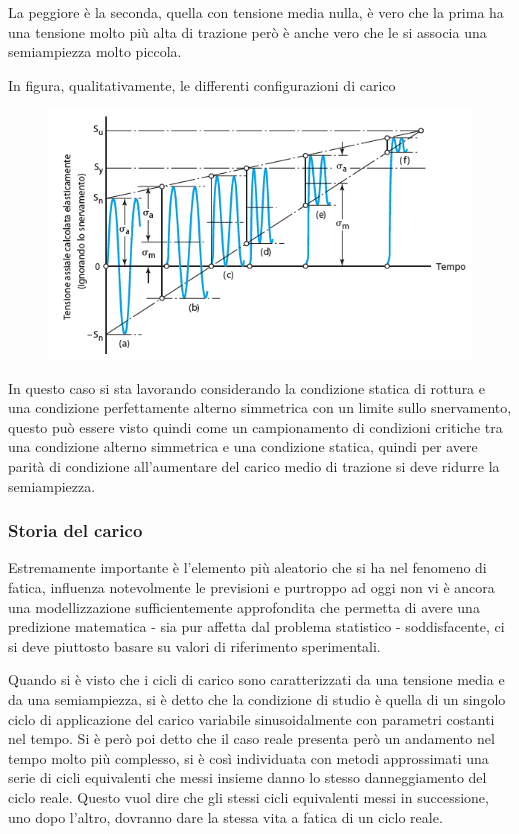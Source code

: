 			 La peggiore è la seconda, quella con tensione media nulla, è vero che la prima ha una tensione molto più alta di trazione però è anche vero che le si associa una semiampiezza molto piccola.\newline 
			 
			 In figura, qualitativamente, le differenti configurazioni di carico  
			 
			 \begin{figure}[H]
			 	\centering
			 	\includegraphics[width=0.5\linewidth]{immagini_10/screenshot031}
			 	\label{fig:screenshot031}
			 \end{figure}
			 
			 In questo caso si sta lavorando considerando la condizione statica di rottura e una condizione perfettamente alterno simmetrica con un limite sullo snervamento, questo può essere visto quindi come un campionamento di condizioni critiche tra una condizione alterno simmetrica e una condizione statica, quindi per avere parità di condizione all'aumentare del carico medio di trazione si deve ridurre la semiampiezza. 
			 
\subsubsection{Storia del carico}
			 Estremamente importante è l'elemento più aleatorio che si ha nel fenomeno di fatica, influenza notevolmente le previsioni e purtroppo ad oggi non vi è ancora una modellizzazione sufficientemente approfondita che permetta di avere una predizione matematica - sia pur affetta dal problema statistico - soddisfacente, ci si deve piuttosto basare su valori di riferimento sperimentali. \newline
			 
			 Quando si è visto che i cicli di carico sono caratterizzati da una tensione media e da una semiampiezza, si è detto che la condizione di studio è quella   di un singolo ciclo di applicazione del carico variabile sinusoidalmente con parametri costanti nel tempo. Si è però poi detto che il caso reale presenta però un andamento nel tempo molto più complesso, si è così individuata con metodi approssimati una serie di cicli equivalenti che messi insieme danno lo stesso danneggiamento del ciclo reale. Questo vuol dire che gli stessi cicli equivalenti messi in successione, uno dopo l'altro, dovranno dare la stessa vita a fatica di un ciclo reale.
			 
